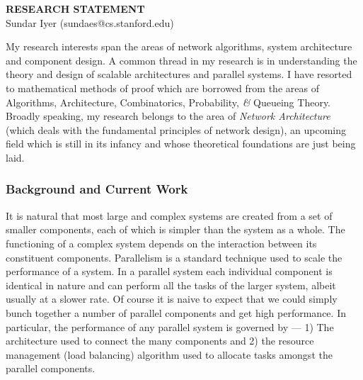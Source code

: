 \documentclass[11pt, a4paper]{article}
\begin{document}
\begin{small}

\begin{center}
{\LARGE \bf RESEARCH STATEMENT}\\
\vspace*{0.1cm}
{\normalsize Sundar Iyer (sundaes@cs.stanford.edu)}
\end{center}



My research interests span the areas of network algorithms, system
architecture and component design. A common thread in my research is in understanding the
theory and design of scalable architectures and parallel systems.
I have resorted to mathematical methods 
of proof which are borrowed from the areas of Algorithms, 
Architecture, Combinatorics, Probability, {\it \&} Queueing Theory.
Broadly speaking, my research belongs to
the area of {\it Network Architecture} (which deals with the fundamental 
principles of network design), 
an upcoming field which is still in its infancy and whose theoretical foundations are just being laid.


\subsubsection*{Background and Current Work}


It is natural that most large and complex systems are created from a set 
of smaller components, each of which is simpler than the system as a whole. 
The functioning of a complex system depends on the interaction between its 
constituent components. Parallelism is a standard technique used to scale the
performance of a system. In a parallel system each individual component is 
identical in nature and can perform all the tasks of the larger system, 
albeit usually at a slower rate. Of course it is naive to expect that
we could simply bunch together a number of parallel components and get high performance.
In particular, the performance of any parallel system is governed by --- 1) The
architecture used to connect the many components and 2) the 
resource management (load balancing) algorithm used to 
allocate tasks amongst the parallel components. 


\end{small}
\end{document}
